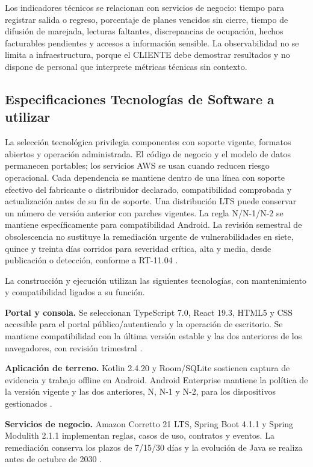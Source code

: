 Los indicadores técnicos se relacionan con servicios de negocio: tiempo para registrar salida o regreso, porcentaje de planes vencidos sin cierre, tiempo de difusión de marejada, lecturas faltantes, discrepancias de ocupación, hechos facturables pendientes y accesos a información sensible. La observabilidad no se limita a infraestructura, porque el CLIENTE debe demostrar resultados y no dispone de personal que interprete métricas técnicas sin contexto.

\subsection{Especificaciones Tecnologías de Software a utilizar}

La selección tecnológica privilegia componentes con soporte vigente, formatos abiertos y operación administrada. El código de negocio y el modelo de datos permanecen portables; los servicios AWS se usan cuando reducen riesgo operacional. Cada dependencia se mantiene dentro de una línea con soporte efectivo del fabricante o distribuidor declarado, compatibilidad comprobada y actualización antes de su fin de soporte. Una distribución LTS puede conservar un número de versión anterior con parches vigentes. La regla N/N-1/N-2 se mantiene específicamente para compatibilidad Android. La revisión semestral de obsolescencia no sustituye la remediación urgente de vulnerabilidades en siete, quince y treinta días corridos para severidad crítica, alta y media, desde publicación o detección, conforme a RT-11.04 \parencite[p.~23]{pucv-transversal}.

La construcción y ejecución utilizan las siguientes tecnologías, con mantenimiento y compatibilidad ligados a su función.

\textbf{Portal y consola.} Se seleccionan TypeScript 7.0, React 19.3, HTML5 y CSS accesible para el portal público/autenticado y la operación de escritorio. Se mantiene compatibilidad con la última versión estable y las dos anteriores de los navegadores, con revisión trimestral \parencites{p3-typescript,p3-react}.

\textbf{Aplicación de terreno.} Kotlin 2.4.20 y Room/SQLite sostienen captura de evidencia y trabajo offline en Android. Android Enterprise mantiene la política de la versión vigente y las dos anteriores, N, N-1 y N-2, para los dispositivos gestionados \parencite{p3-kotlin}.

\textbf{Servicios de negocio.} Amazon Corretto 21 LTS, Spring Boot 4.1.1 y Spring Modulith 2.1.1 implementan reglas, casos de uso, contratos y eventos. La remediación conserva los plazos de 7/15/30 días y la evolución de Java se realiza antes de octubre de 2030 \parencites{p3-corretto,p3-modulith}.

